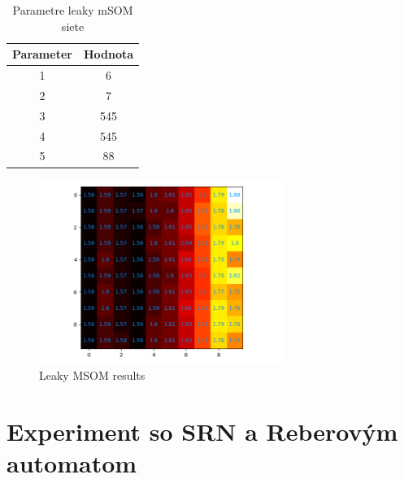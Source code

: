 \begin{table}[h!]
    \centering
    \begin{tabular}{|c|c|} 
     \hline
     Parameter & Hodnota \\ 
     \hline\hline
     1 & 6  \\ 
     \hline
     2 & 7   \\
     \hline
     3 & 545  \\
     \hline
     4 & 545  \\
     \hline
     5 & 88 \\  
     \hline
    \end{tabular}
    \caption{Parametre leaky mSOM siete}
    \label{table:2}
\end{table}

\begin{figure}[H]
    \centering
    \includegraphics[width=8cm]{assets/leakymsom_abcd}
    \caption{Leaky MSOM results}
\end{figure}


\section{Experiment so SRN a Reberovým automatom}



